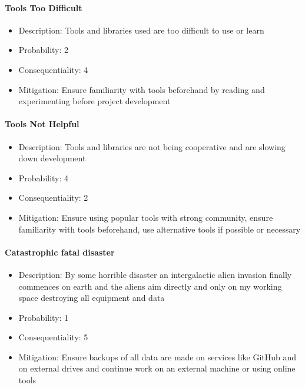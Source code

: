 \documentclass[12pt]{article}
\begin{document}
    \paragraph{Tools Too Difficult}
    \begin{itemize}
        \item Description: Tools and libraries used are too difficult to use or learn
        \item Probability: 2
        \item Consequentiality: 4
        \item Mitigation: Ensure familiarity with tools beforehand by reading and experimenting before project
        development
    \end{itemize}

    \paragraph{Tools Not Helpful}
    \begin{itemize}
        \item Description: Tools and libraries are not being cooperative and are slowing down development
        \item Probability: 4
        \item Consequentiality: 2
        \item Mitigation: Ensure using popular tools with strong community, ensure familiarity with tools beforehand,
        use alternative tools if possible or necessary
    \end{itemize}

    \paragraph{Catastrophic fatal disaster}
    \begin{itemize}
        \item Description: By some horrible disaster an intergalactic alien invasion finally commences on earth and
        the aliens aim directly and only on my working space destroying all equipment and data
        \item Probability: 1
        \item Consequentiality: 5
        \item Mitigation: Ensure backups of all data are made on services like GitHub and on external drives and
        continue work on an external machine or using online tools
    \end{itemize}
\end{document}
